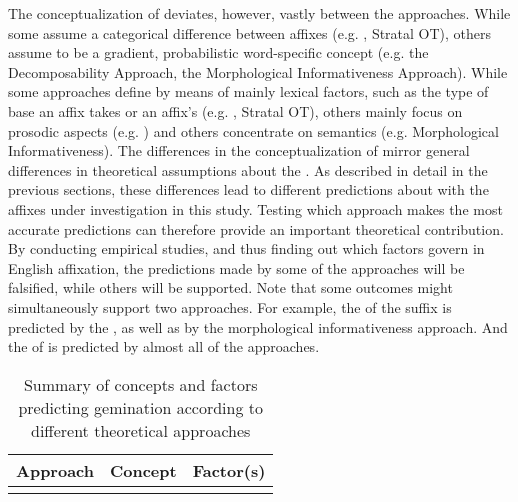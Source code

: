 {{{ The conceptualization of  deviates, however, vastly between the approaches. While some assume a categorical difference between affixes (e.g. , Stratal OT), others assume  to be a gradient, probabilistic word-specific concept (e.g. the Decomposability Approach, the Morphological Informativeness Approach). 
 While some approaches define  by means of mainly lexical factors, such as the type of base an affix takes or an affix's  (e.g. , Stratal OT), others mainly focus on prosodic aspects (e.g. ) and others concentrate on semantics (e.g. Morphological Informativeness).  The differences in the conceptualization of  mirror general differences in theoretical assumptions about the . As described in detail in the previous sections, these differences lead to different predictions about  with the affixes under investigation in this study.
 Testing which approach makes the most accurate predictions can therefore provide an important theoretical contribution. 
 By conducting empirical studies, and thus finding out which factors govern  in English affixation, the predictions made by some of the approaches will be falsified, while others will be supported. Note that some outcomes might simultaneously support two approaches. For example, the  of the suffix  is predicted by the , as well as by the morphological informativeness approach. And the  of  is predicted by almost all of the approaches.



\begin{table*}

	\caption{{Summary of concepts and factors predicting gemination according to different theoretical approaches}}
	\label{tbl:Factors predicting gemination}

	
		\begin{tabularx}{\textwidth}{lll}
				\lsptoprule
			\textbf{Approach }& \textbf{Concept }& \textbf{Factor(s)} \\ 
			\midrule

			\\
			

\end{tabularx}
\end{table*}}}}
